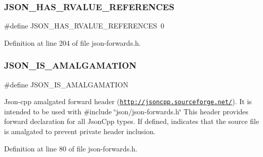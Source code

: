 \hypertarget{json-forwards_8h_a978860f0e3983ca76a4e5af28d9bccd4}{}\label{json-forwards_8h_a978860f0e3983ca76a4e5af28d9bccd4} 
\subsubsection{\texorpdfstring{J\+S\+O\+N\+\_\+\+H\+A\+S\+\_\+\+R\+V\+A\+L\+U\+E\+\_\+\+R\+E\+F\+E\+R\+E\+N\+C\+ES}{JSON\_HAS\_RVALUE\_REFERENCES}}
{\footnotesize\ttfamily \#define J\+S\+O\+N\+\_\+\+H\+A\+S\+\_\+\+R\+V\+A\+L\+U\+E\+\_\+\+R\+E\+F\+E\+R\+E\+N\+C\+ES~0}



Definition at line 204 of file json-\/forwards.\+h.

\hypertarget{json-forwards_8h_a1bf16856b5e907aa83ed7bc825bc5ecf}{}\label{json-forwards_8h_a1bf16856b5e907aa83ed7bc825bc5ecf} 
\subsubsection{\texorpdfstring{J\+S\+O\+N\+\_\+\+I\+S\+\_\+\+A\+M\+A\+L\+G\+A\+M\+A\+T\+I\+ON}{JSON\_IS\_AMALGAMATION}}
{\footnotesize\ttfamily \#define J\+S\+O\+N\+\_\+\+I\+S\+\_\+\+A\+M\+A\+L\+G\+A\+M\+A\+T\+I\+ON}

Json-\/cpp amalgated forward header (\href{http://jsoncpp.sourceforge.net/}{\tt http\+://jsoncpp.\+sourceforge.\+net/}). It is intended to be used with \#include \char`\"{}json/json-\/forwards.\+h\char`\"{} This header provides forward declaration for all Json\+Cpp types. If defined, indicates that the source file is amalgated to prevent private header inclusion. 

Definition at line 80 of file json-\/forwards.\+h.

\hypertarget{json-forwards_8h_a51968e67b1462ac893f87a0fc8b791cd}{}\label{json-forwards_8h_a51968e67b1462ac893f87a0fc8b791cd} 
